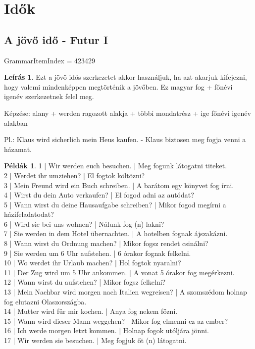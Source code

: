 \documentclass{article}
\theoremstyle{definition}
\newtheorem*{exmp}{Példák}
\newtheorem*{desc}{Leírás}
\begin{document}
\section{Idők}

\subsection{A jövő idő - Futur I}

GrammarItemIndex = 423429

\begin{desc}
Ezt a jövő idős szerkezetet akkor használjuk, ha azt akarjuk kifejezni, hogy valemi mindenképpen megtörténik a jövőben. Ez magyar fog + főnévi igenév szerkezetnek felel meg.

Képzése: alany + werden ragozott alakja + többi mondatrész + ige főnévi igenév alakban

Pl.: Klaus wird sicherlich mein Heus kaufen. - Klaus biztosen meg fogja venni a házamat.
\end{desc}

\begin{exmp}
1 | Wir werden euch besuchen. | Meg fogunk látogatni titeket.\\
2 | Werdet ihr umziehen? | El fogtok költözni?\\
3 | Mein Freund wird ein Buch schreiben. | A barátom egy könyvet fog írni.\\
4 | Wirst du dein Auto verkaufen? | El fogod adni az autódat?\\
5 | Wann wirst du deine Hausaufgabe schreiben? | Mikor fogod megírni a házifeladatodat?\\
6 | Wird sie bei uns wohnen? | Nálunk fog (n) lakni?\\
7 | Sie werden in dem Hotel übernachten. | A hotelben fognak ájszakázni.\\
8 | Wann wirst du Ordnung machen? | Mikor fogsz rendet csinálni?\\
9 | Sie werden um 6 Uhr aufstehen. | 6 órakor fognak felkelni.\\
10 | Wo werdet ihr Urlaub machen? | Hol fogtok nyaralni?\\
11 | Der Zug wird um 5 Uhr ankommen. | A vonat 5 órakor fog megérkezni.\\
12 | Wann wirst du aufstehen? | Mikor fogsz felkelni?\\
13 | Mein Nachbar wird morgen nach Italien wegreisen? | A szomszédom holnap fog elutazni Olaszországba.\\
14 | Mutter wird für mir kochen. | Anya fog nekem főzni.\\
15 | Wann wird dieser Mann weggehen? | Mikor fog elmenni ez az ember?\\
16 | Ich werde morgen letzt kommen. | Holnap fogok utóljára jönni.\\
17 | Wir werden sie besuchen. | Meg fogjuk őt (n) látogatni.\\
\end{exmp}
\end{document}

